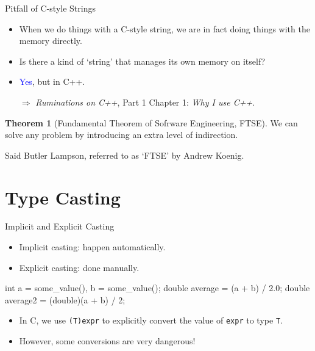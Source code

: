 \documentclass{beamer}
\newcommand{\blue}[1]{\textcolor{blue}{#1}}
\newcommand{\ttt}[1]{\texttt{#1}}
\theoremstyle{definition}
\newtheorem{thm}{Theorem}
\begin{document}
\begin{frame}[fragile]{Pitfall of C-style Strings}
    \begin{itemize}
        \item When we do things with a C-style string, we are in fact doing things with the memory directly.
        \item Is there a kind of `string' that manages its own memory on itself?
        \pause
        \item \blue{Yes}, but in C++.
        \item[\(\Rightarrow\)] \textit{Ruminations on C++}, Part 1 Chapter 1: \textit{Why I use C++}.
    \end{itemize}
    \begin{thm}[Fundamental Theorem of Sofrware Engineering, FTSE]
        We can solve any problem by introducing an extra level of indirection.
    \end{thm}
    Said Butler Lampson, referred to as `FTSE' by Andrew Koenig.
\end{frame}

\section{Type Casting}

\begin{frame}[fragile]{Implicit and Explicit Casting}
    \begin{itemize}
        \item Implicit casting: happen automatically.
        \item Explicit casting: done manually.
    \end{itemize}
    \pause
    \begin{cpp}
int a = some_value(), b = some_value();
double average = (a + b) / 2.0;
double average2 = (double)(a + b) / 2;
    \end{cpp}
    \pause
    \begin{itemize}
        \item In C, we use \ttt{(T)expr} to explicitly convert the value of \ttt{expr} to type \ttt{T}.
        \item However, some conversions are very dangerous!
    \end{itemize}
\end{frame}
\end{document}
